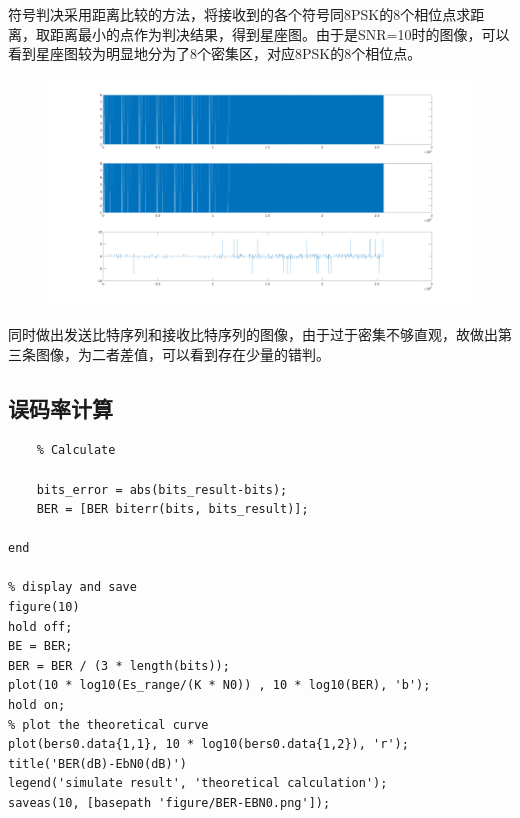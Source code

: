\begin{spacing}{1.5}
符号判决采用距离比较的方法，将接收到的各个符号同8PSK的8个相位点求距离，取距离最小的点作为判决结果，得到星座图。由于是SNR=10时的图像，可以看到星座图较为明显地分为了8个密集区，对应8PSK的8个相位点。


\begin{figure}[H]
\centering
\includegraphics[width = \columnwidth]{error.png}
\end{figure}

同时做出发送比特序列和接收比特序列的图像，由于过于密集不够直观，故做出第三条图像，为二者差值，可以看到存在少量的错判。

\subsection{误码率计算}

\begin{lstlisting}
    % Calculate
    
    bits_error = abs(bits_result-bits);
    BER = [BER biterr(bits, bits_result)];
    
end

% display and save
figure(10)
hold off;
BE = BER;
BER = BER / (3 * length(bits));
plot(10 * log10(Es_range/(K * N0)) , 10 * log10(BER), 'b');
hold on;
% plot the theoretical curve
plot(bers0.data{1,1}, 10 * log10(bers0.data{1,2}), 'r');
title('BER(dB)-EbN0(dB)')
legend('simulate result', 'theoretical calculation');
saveas(10, [basepath 'figure/BER-EBN0.png']);
\end{lstlisting}


\end{spacing}
